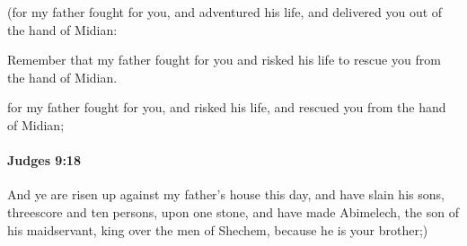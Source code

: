 			\begin{versebox}
					\item[BHS] 
					\item[ASV] (for my father fought for you, and adventured his life, and delivered you out of the hand of Midian:
					\item[NIV] Remember that my father fought for you and risked his life to rescue you from the hand of Midian.
					\item[NRSV] for my father fought for you, and risked his life, and rescued you from the hand of Midian;
			\end{versebox}

		\paragraph{Judges 9:18} %
			\label{JUDGES-9-18}

			And ye are risen up against my father’s house this day, and have slain his sons, threescore and ten persons, upon one stone, and have made Abimelech, the son of his maidservant, king over the men of Shechem, because he is your brother;)

